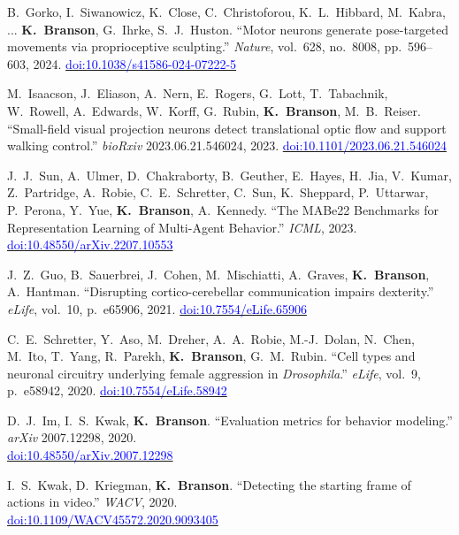 \begin{cvenum}
\item B.~Gorko, I.~Siwanowicz, K.~Close, C.~Christoforou, K.~L.~Hibbard, M.~Kabra, ... {\bf K.~Branson}, G.~Ihrke, S.~J.~Huston. ``Motor neurons generate pose-targeted movements via proprioceptive sculpting.'' {\em Nature}, vol.~628, no.~8008, pp.~596--603, 2024. \href{https://doi.org/10.1038/s41586-024-07222-5}{\small\textcolor{blue}{doi:10.1038/s41586-024-07222-5}}

\item M.~Isaacson, J.~Eliason, A.~Nern, E.~Rogers, G.~Lott, T.~Tabachnik, W.~Rowell, A.~Edwards, W.~Korff, G.~Rubin, {\bf K.~Branson},  M.~B.~Reiser. ``Small-field visual projection neurons detect translational optic flow and support walking control.'' {\em bioRxiv} 2023.06.21.546024, 2023. \href{https://doi.org/10.1101/2023.06.21.546024}{\small\textcolor{blue}{doi:10.1101/2023.06.21.546024}}

\item J.~J.~Sun, A.~Ulmer, D.~Chakraborty, B.~Geuther, E.~Hayes, H.~Jia, V.~Kumar, Z.~Partridge, A.~Robie, C.~E.~Schretter,  C.~Sun, K.~Sheppard, P.~Uttarwar, P.~Perona, Y.~Yue, {\bf K.~Branson}, A.~Kennedy. ``The MABe22 Benchmarks for Representation Learning of Multi-Agent Behavior.'' {\em ICML}, 2023. \href{https://doi.org/10.48550/arXiv.2207.10553}{\small\textcolor{blue}{doi:10.48550/arXiv.2207.10553}}

\item J.~Z.~Guo, B.~Sauerbrei, J.~Cohen, M.~Mischiatti, A.~Graves, {\bf K.~Branson}, A.~Hantman. ``Disrupting cortico-cerebellar communication impairs dexterity.'' {\em eLife}, vol.~10, p.~e65906, 2021. \href{https://doi.org/10.7554/eLife.65906}{\small\textcolor{blue}{doi:10.7554/eLife.65906}}

\item C.~E.~Schretter, Y.~Aso, M.~Dreher, A.~A.~Robie, M.-J.~Dolan, N.~Chen, M.~Ito, T.~Yang, R.~Parekh, {\bf K.~Branson}, G.~M.~Rubin. ``Cell types and neuronal circuitry underlying female aggression in {\em {D}rosophila}.'' {\em eLife}, vol.~9, p.~e58942, 2020. \href{https://doi.org/10.7554/eLife.58942}{\small\textcolor{blue}{doi:10.7554/eLife.58942}}
  
\item D.~J.~Im, I.~S.~Kwak, {\bf K.~Branson}. ``Evaluation metrics for behavior modeling.'' {\em arXiv} 2007.12298, 2020.\\\href{https://doi.org/10.48550/arXiv.2007.12298}{\small\textcolor{blue}{doi:10.48550/arXiv.2007.12298}}
  
\item I.~S.~Kwak, D.~Kriegman, {\bf K.~Branson}. ``Detecting the starting frame of actions in video.'' {\em WACV}, 2020.\\\href{https://doi.org/10.1109/WACV45572.2020.9093405}{\small\textcolor{blue}{doi:10.1109/WACV45572.2020.9093405}}


\end{cvenum}
